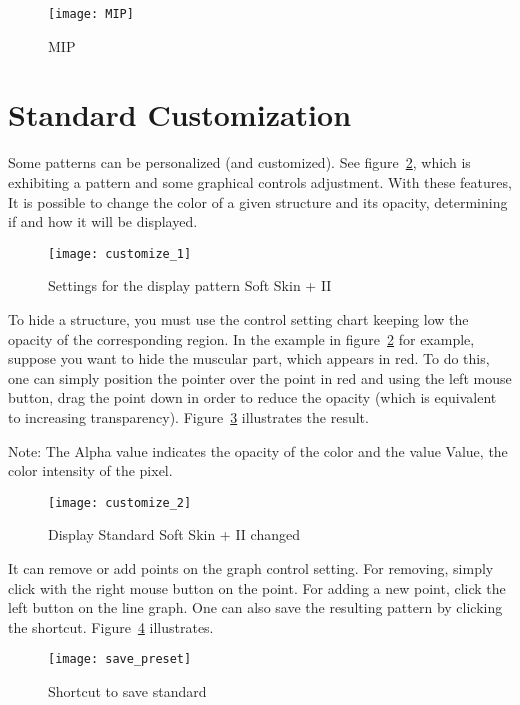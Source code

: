 \begin{figure}[!htb]
\centering
\texttt{[image: MIP]}
\caption{MIP}
\label{fig:MIP}
\end{figure}

\newpage

\section{Standard Customization}

Some patterns can be personalized (and customized). See figure~\ref{fig:customize_1}, which is exhibiting a pattern and some graphical controls adjustment. With these features, It is possible to change the color of a given structure and its opacity, determining if and how it will be displayed.

\begin{figure}[!htb]
\centering
\texttt{[image: customize\_1]}
\caption{Settings for the display pattern Soft Skin + II}
\label{fig:customize_1}
\end{figure}


\newpage

To hide a structure, you must use the control setting chart keeping low the opacity of the corresponding region. In the example in figure~\ref{fig:customize_1} for example, suppose you want to hide the muscular part, which appears in red. To do this, one can simply position the pointer over the point in red and using the left mouse button, drag the point down in order to reduce the opacity (which is equivalent to increasing transparency). Figure~\ref{fig:customize_2} illustrates the result.

Note: The Alpha value indicates the opacity of the color and the value Value, the color intensity of the pixel.

\begin{figure}[!htb]
\centering
\texttt{[image: customize\_2]}
\caption{Display Standard Soft Skin + II changed}
\label{fig:customize_2}
\end{figure}


\newpage


It can remove or add points on the graph control setting. For removing, simply click with the right mouse button on the point. For adding a new point, click the left button on the line
graph. One can also save the resulting pattern by clicking the shortcut.  Figure~\ref{fig:save_preset} illustrates.

\begin{figure}[!htb]
\centering
\texttt{[image: save\_preset]}
\caption{Shortcut to save standard}
\label{fig:save_preset}
\end{figure}
 
